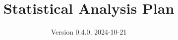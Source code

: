 \documentclass[
]{scrartcl}
\title{Statistical Analysis Plan}
\subtitle{ADVANCE TRAUMA\\
\strut \\
Effects of Advanced Trauma Life Support\textsuperscript{®} Training
Compared to Standard Care on Adult Trauma Patient Outcomes: A Cluster
Randomised Trial}
\author{Version 0.4.0, 2024-10-21}
\date{}
\begin{document}


\begin{titlepage}


\newcommand{\titlepagepagealign}{
\ifthenelse{\equal{center}{right}}{\raggedleft}{}
\ifthenelse{\equal{center}{center}}{\centering}{}
\ifthenelse{\equal{center}{left}}{\raggedright}{}
}


\newcommand{\titleandsubtitle}{
{\fontsize{15}{18.0}\selectfont
{\uppercase{\nohyphens{Statistical Analysis Plan}}}\par
}%

\vspace{\betweentitlesubtitle}
{
\fontsize{20}{24.0}\selectfont
{\bfseries{\nohyphens{ADVANCE TRAUMA\\
\strut \\
Effects of Advanced Trauma Life Support\textsuperscript{®} Training
Compared to Standard Care on Adult Trauma Patient Outcomes: A Cluster
Randomised Trial}}}\par
}}
\newcommand{\titlepagetitleblock}{
\rule{\textwidth}{0.4pt} %
\vspace{0.025\textheight} %

\titleandsubtitle

\vspace{0.025\textheight} 
\rule{0.3\textwidth}{0.4pt} %
}
\newcommand{\authorstyle}[1]{{\Large{#1}}}

\newcommand{\affiliationstyle}[1]{{\large{#1}}}

\newcommand{\titlepageauthorblock}{
{\authorstyle{\nohyphens{Version 0.4.0, 2024-10-21}\\}}
}

\newcommand{\titlepageaffiliationblock}{
\hangindent=1em
\hangafter=1
{\affiliationstyle{


\vspace{1\baselineskip} 
}}
}
\newcommand{\headerstyled}{%
{}
}
\newcommand{\footerstyled}{%
{\large{\textsc{}}}
}
\newcommand{\datestyled}{%
{}
}


\newcommand{\titlepageheaderblock}{\headerstyled}

\newcommand{\titlepagefooterblock}{
\footerstyled
}

\newcommand{\titlepagedateblock}{
\datestyled
}

\newcommand{\titleblock}{\newlength{\betweentitlesubtitle}
\setlength{\betweentitlesubtitle}{\baselineskip}
{

}}
\end{titlepage}
\end{document}
